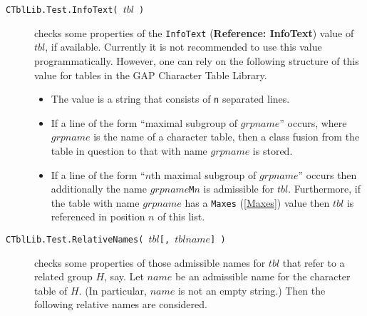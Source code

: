 \documentclass[a4paper,11pt]{report}
\begin{document}
{{ 
\begin{description}
\item[{\texttt{CTblLib.Test.InfoText( }$tbl$\texttt{ )}}]  checks some properties of the \texttt{InfoText} (\textbf{Reference: InfoText}) value of $tbl$, if available. Currently it is not recommended to use this value
programmatically. However, one can rely on the following structure of this
value for tables in the \textsf{GAP} Character Table Library. 

 
\begin{itemize}
\item  The value is a string that consists of \texttt{\texttt{}n} separated lines. 
\item  If a line of the form ``maximal subgroup of $grpname$'' occurs, where $grpname$ is the name of a character table, then a class fusion from the table in
question to that with name $grpname$ is stored. 
\item  If a line of the form ``$n$th maximal subgroup of $grpname$'' occurs then additionally the name $grpname$\texttt{M}$n$ is admissible for $tbl$. Furthermore, if the table with name $grpname$ has a \texttt{Maxes} (\ref{Maxes}) value then $tbl$ is referenced in position $n$ of this list. 
\end{itemize}
 
\item[{\texttt{CTblLib.Test.RelativeNames( }$tbl$\texttt{[, }$tblname$\texttt{] )}}]  checks some properties of those admissible names for $tbl$ that refer to a related group $H$, say. Let $name$ be an admissible name for the character table of $H$. (In particular, $name$ is not an empty string.) Then the following relative names are considered. 


\end{description}}}
\end{document}

